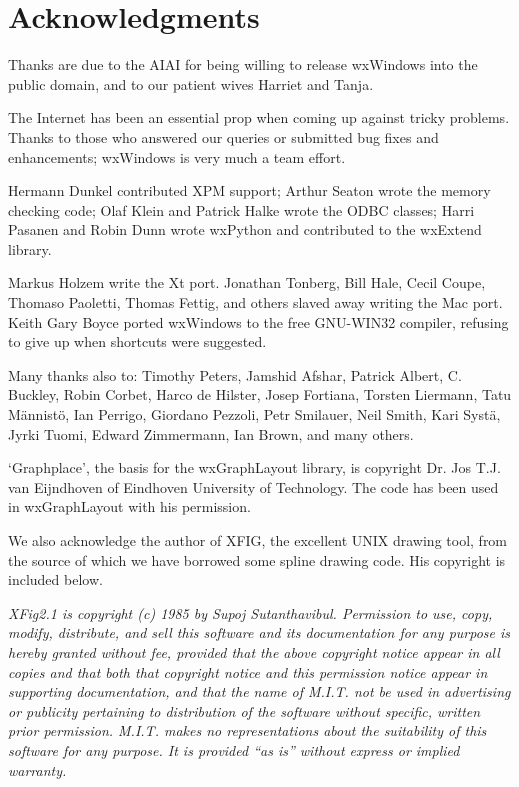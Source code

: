 \section{Acknowledgments}

Thanks are due to the AIAI for being willing to release wxWindows into
the public domain, and to our patient wives Harriet and Tanja.

The Internet has been an essential prop when coming up against tricky
problems. Thanks to those who answered our
queries or submitted bug fixes and enhancements; wxWindows is very
much a team effort.

Hermann Dunkel contributed XPM support; Arthur Seaton wrote the memory
checking code; Olaf Klein and Patrick Halke wrote the ODBC classes;
Harri Pasanen and Robin Dunn wrote wxPython and contributed to the
wxExtend library.

Markus Holzem write the Xt port. Jonathan Tonberg, Bill Hale,
Cecil Coupe, Thomaso Paoletti, Thomas Fettig, and others slaved away
writing the Mac port.  Keith Gary Boyce ported wxWindows to the free
GNU-WIN32 compiler, refusing to give up when shortcuts were suggested.

Many thanks also to: Timothy Peters, Jamshid Afshar, Patrick Albert, C. Buckley,
Robin Corbet, Harco de Hilster, Josep Fortiana, Torsten Liermann, Tatu
M\"{a}nnist\"{o}, Ian Perrigo, Giordano Pezzoli, Petr Smilauer, Neil Smith,
Kari Syst\"{a}, Jyrki Tuomi, Edward Zimmermann, Ian Brown, and many
others.

`Graphplace', the basis for the wxGraphLayout library, is copyright Dr. Jos
T.J. van Eijndhoven of Eindhoven University of Technology. The code has
been used in wxGraphLayout with his permission.

We also acknowledge the author of XFIG, the excellent UNIX drawing tool,
from the source of which we have borrowed some spline drawing code.
His copyright is included below.

{\it XFig2.1 is copyright (c) 1985 by Supoj Sutanthavibul. Permission to
use, copy, modify, distribute, and sell this software and its
documentation for any purpose is hereby granted without fee, provided
that the above copyright notice appear in all copies and that both that
copyright notice and this permission notice appear in supporting
documentation, and that the name of M.I.T. not be used in advertising or
publicity pertaining to distribution of the software without specific,
written prior permission.  M.I.T. makes no representations about the
suitability of this software for any purpose.  It is provided ``as is''
without express or implied warranty.}

